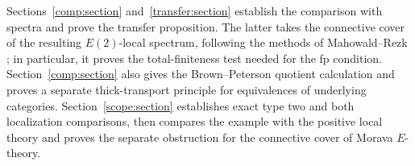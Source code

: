 \documentclass[11pt]{article}
\theoremstyle{definition}
\theoremstyle{remark}
\numberwithin{equation}{section}
\begin{document}
Sections~\ref{comp:section} and~\ref{transfer:section} establish the
comparison with spectra and prove the transfer proposition. The latter
takes the connective cover of the resulting $E(2)$-local spectrum,
following the methods of Mahowald--Rezk
\cite[Proposition~3.5 and Section~7.2(2)]{MR1999}; in particular, it proves
the total-finiteness test needed for the fp condition.
Section~\ref{comp:section} also gives the Brown--Peterson quotient
calculation and proves a separate thick-transport principle for
equivalences of underlying categories.
Section~\ref{scope:section} establishes exact type two and both localization
comparisons, then compares the example with the positive local theory and
proves the separate obstruction for the connective cover of Morava $E$-theory.

\tableofcontents










\end{document}
